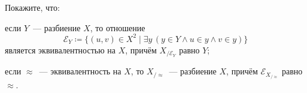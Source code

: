 Покажите, что:
\begin{enumcyr}
    \item если $Y$~--- разбиение $X$, то отношение
        $$
            \mathscr{E}_Y \coloneqq \{ (u, v) \in X^2 \mid \exists y\, (y \in Y \wedge u \in y \wedge v
            \in y)\}
        $$
        является эквивалентностью на $X$, причём $X_{/{\mathscr{E}_Y}}$ равно $Y$;
    \item если $\approx$~--- эквивалентность на $X$, то $X_{/\approx}$~--- разбиение $X$, причём
        $\mathscr{E}_{X_{/\approx}}$ равно $\approx$.
\end{enumcyr}
